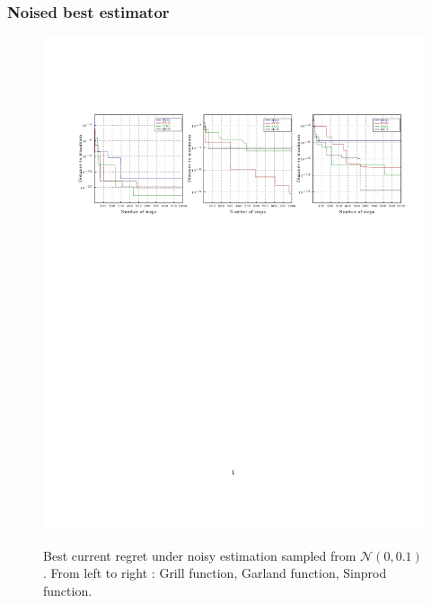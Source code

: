 \documentclass[xcolor={usenames,dvipsnames}]{beamer}
\begin{document}
\begin{frame}
\frametitle{Noised best estimator}
\begin{figure}
\includegraphics[trim={2cm 6cm 1cm 4cm},clip,scale = 0.65]{best1000_01.pdf}\\
\vspace*{-8cm}
 \caption{\label{fig:noise01}Best current regret under noisy estimation sampled from $\mathcal{N}(0,0.1)$ . From left to right : Grill function, Garland function, Sinprod function.}
\end{figure}
\end{frame}
\end{document}
